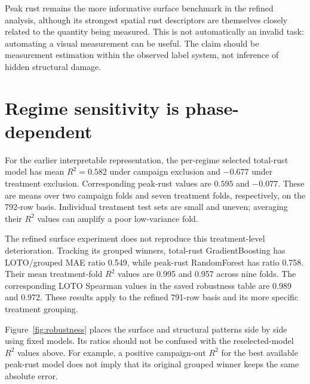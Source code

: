Peak rust remains the more informative surface benchmark in the refined analysis, although its strongest spatial rust descriptors are themselves closely related to the quantity being measured. This is not automatically an invalid task: automating a visual measurement can be useful. The claim should be measurement estimation within the observed label system, not inference of hidden structural damage.

\section{Regime sensitivity is phase-dependent}
For the earlier interpretable representation, the per-regime selected total-rust model has mean $R^2=0.582$ under campaign exclusion and $-0.677$ under treatment exclusion. Corresponding peak-rust values are $0.595$ and $-0.077$. These are means over two campaign folds and seven treatment folds, respectively, on the 792-row basis. Individual treatment test sets are small and uneven; averaging their $R^2$ values can amplify a poor low-variance fold.

The refined surface experiment does not reproduce this treatment-level deterioration. Tracking its grouped winners, total-rust GradientBoosting has LOTO/grouped MAE ratio 0.549, while peak-rust RandomForest has ratio 0.758. Their mean treatment-fold $R^2$ values are 0.995 and 0.957 across nine folds. The corresponding LOTO Spearman values in the saved robustness table are 0.989 and 0.972. These results apply to the refined 791-row basis and its more specific treatment grouping.

Figure~\ref{fig:robustness} places the surface and structural patterns side by side using fixed models. Its ratios should not be confused with the reselected-model $R^2$ values above. For example, a positive campaign-out $R^2$ for the best available peak-rust model does not imply that its original grouped winner keeps the same absolute error.


